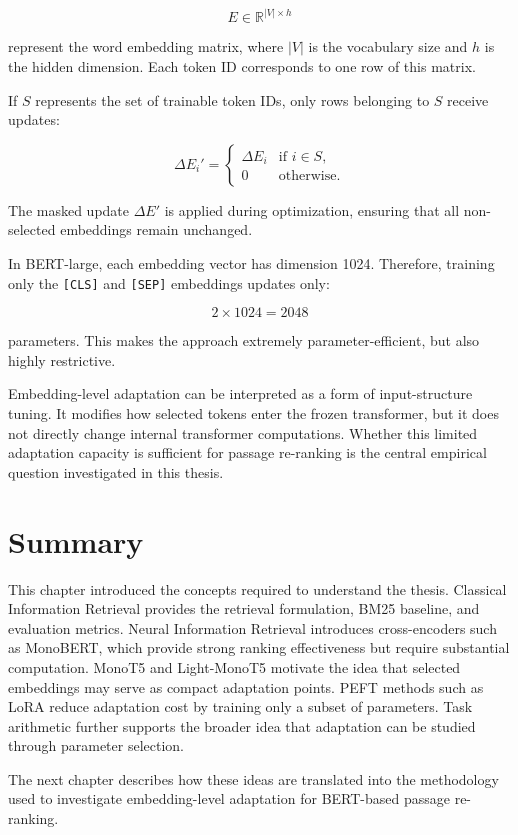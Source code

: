 \begin{equation}
    E \in \mathbb{R}^{|V| \times h}
\end{equation}

represent the word embedding matrix, where $|V|$ is the vocabulary size and $h$ is the hidden dimension. Each token ID corresponds to one row of this matrix.

If $S$ represents the set of trainable token IDs, only rows belonging to $S$ receive updates:

\begin{equation}
    \Delta E_i' =
    \begin{cases}
    \Delta E_i & \text{if } i \in S,\\
    0 & \text{otherwise}.
    \end{cases}
\end{equation}

The masked update $\Delta E'$ is applied during optimization, ensuring that all non-selected embeddings remain unchanged.

In BERT-large, each embedding vector has dimension 1024. Therefore, training only the \texttt{[CLS]} and \texttt{[SEP]} embeddings updates only:

\begin{equation}
    2 \times 1024 = 2048
\end{equation}

parameters. This makes the approach extremely parameter-efficient, but also highly restrictive.

Embedding-level adaptation can be interpreted as a form of input-structure tuning. It modifies how selected tokens enter the frozen transformer, but it does not directly change internal transformer computations. Whether this limited adaptation capacity is sufficient for passage re-ranking is the central empirical question investigated in this thesis.


\section{Summary}
\label{sec:background_summary}

This chapter introduced the concepts required to understand the thesis. Classical Information Retrieval provides the retrieval formulation, BM25 baseline, and evaluation metrics. Neural Information Retrieval introduces cross-encoders such as MonoBERT, which provide strong ranking effectiveness but require substantial computation. MonoT5 and Light-MonoT5 motivate the idea that selected embeddings may serve as compact adaptation points. PEFT methods such as LoRA reduce adaptation cost by training only a subset of parameters. Task arithmetic further supports the broader idea that adaptation can be studied through parameter selection.

The next chapter describes how these ideas are translated into the methodology used to investigate embedding-level adaptation for BERT-based passage re-ranking.